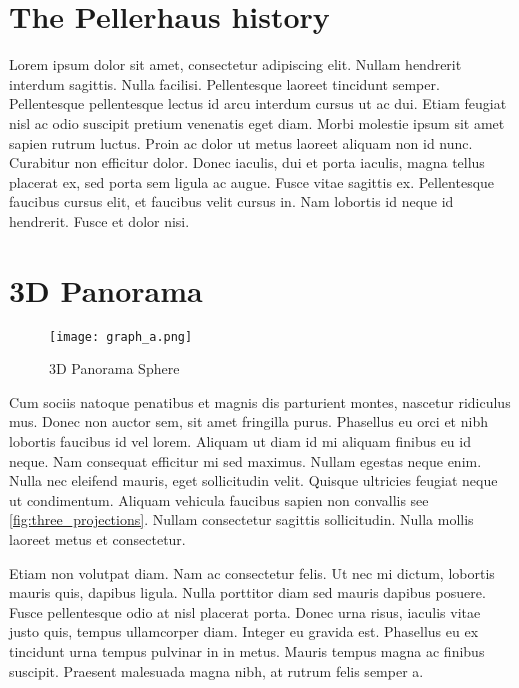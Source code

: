
\section{The Pellerhaus history}

Lorem ipsum dolor sit amet, consectetur adipiscing elit. Nullam hendrerit interdum sagittis. Nulla facilisi. Pellentesque laoreet tincidunt semper. Pellentesque pellentesque lectus id arcu interdum cursus ut ac dui. Etiam feugiat nisl ac odio suscipit pretium venenatis eget diam. Morbi molestie ipsum sit amet sapien rutrum luctus. Proin ac dolor ut metus laoreet aliquam non id nunc. Curabitur non efficitur dolor. Donec iaculis, dui et porta iaculis, magna tellus placerat ex, sed porta sem ligula ac augue. Fusce vitae sagittis ex. Pellentesque faucibus cursus elit, et faucibus velit cursus in. Nam lobortis id neque id hendrerit. Fusce et dolor nisi.

\section{3D Panorama}


\pagestyle{empty}

\begin{figure}[h]
	\centering
	\texttt{[image: graph\_a.png]}
	\caption{3D Panorama Sphere}
	\label{fig:3d_panorama_sphere}
\end{figure}

Cum sociis natoque penatibus et magnis dis parturient montes, nascetur ridiculus mus. Donec non auctor sem, sit amet fringilla purus. Phasellus eu orci et nibh lobortis faucibus id vel lorem. Aliquam ut diam id mi aliquam finibus eu id neque. Nam consequat efficitur mi sed maximus. Nullam egestas neque enim. Nulla nec eleifend mauris, eget sollicitudin velit. Quisque ultricies feugiat neque ut condimentum. Aliquam vehicula faucibus sapien non convallis see \ref{fig:three_projections}. Nullam consectetur sagittis sollicitudin. Nulla mollis laoreet metus et consectetur.



Etiam non volutpat diam. Nam ac consectetur felis. Ut nec mi dictum, lobortis mauris quis, dapibus ligula. Nulla porttitor diam sed mauris dapibus posuere. Fusce pellentesque odio at nisl placerat porta. Donec urna risus, iaculis vitae justo quis, tempus ullamcorper diam. Integer eu gravida est. Phasellus eu ex tincidunt urna tempus pulvinar in in metus. Mauris tempus magna ac finibus suscipit. Praesent malesuada magna nibh, at rutrum felis semper a.


